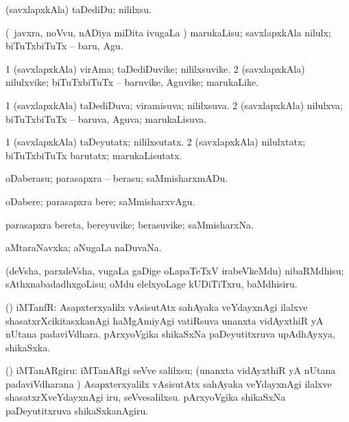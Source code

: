 \bentry
{}
\gl{\sakirx}
\bmng
(savxlapxkAla) taDediDu; nililxsu. 
\emng

\noindent 
\gl{\akirx}
\bmng
(\kanmu\ javxra, noVvu, nADiya miDita ivugaLa \vi) marukaLisu; savxlapxkAla nilulx; biTuTxbiTuTx -- baru, Agu. 
\emng
\eentry

\bentry
{}
\gl{\nA}
\bmng
\bnum
\num{1} (savxlapxkAla) virAma; taDediDuvike; nililxsuvike. 
\num{2} (savxlapxkAla) nilulxvike; biTuTxbiTuTx -- baruvike, Aguvike; marukaLike. 
\enum
\emng
\eentry

\bentry
{}
\gl{\gu}
\bmng
\bnum
\num{1} (savxlapxkAla) taDediDuva; viramisuva; nililxsuva. 
\num{2} (savxlapxkAla) nilulxva; biTuTxbiTuTx -- baruva, Aguva; marukaLisuva. 
\enum
\emng
\eentry

\bentry
{}
\gl{\kirxvi}
\bmng
\bnum
\num{1} (savxlapxkAla) taDeyutatx; nililxsutatx. 
\num{2} (savxlapxkAla) nilulxtatx; biTuTxbiTuTx barutatx; marukaLisutatx. 
\enum
\emng
\eentry

\bentry
{}
\gl{\sakirx}
\bmng
oDaberasu; parasapxra -- berasu; saMmisharxmADu. 
\emng

\noindent 
\gl{\akirx}
\bmng
oDabere; parasapxra bere; saMmisharxvAgu. 
\emng
\eentry

\bentry
{}
\gl{\nA}
\bmng
parasapxra bereta, bereyuvike; berasuvike; saMmisharxNa. 
\emng
\eentry

\bentry
{}
\gl{\gu}
\bmng
aMtaraNavxka; aNugaLa naDuvaNa. 
\emng
\eentry

\bentry
{}
\gl{\sakirx}
\bmng
(deVsha, parxdeVsha, \mo vugaLa gaDige oLapaTeTxV irabeVkeMdu) nibaRMdhisu; sAthxnabadadhxgoLisu; oMdu elelxyoLage kUDiTiTxru, baMdhisiru. 
\emng
\eentry

\bentry
{}
\gl{\nA}
\bmng
 (\ame) iMTanfR: 
\banum
{} Asapxterxyalilx vAsisutAtx sahAyaka veYdayxnAgi ilalxve shasatxrXcikitasxkanAgi haMgAmiyAgi vatiRsuva unanxta vidAyxthiR yA nUtana padaviVdhara. 
 pArxyoVgika shikaSxNa paDeyutitxruva upAdhAyxya, shikaSxka. 
\eanum
\emng
\eentry

\bentry
{}
\gl{\akirx}
\bmng
(\ame) iMTanARgiru: 
\banum
{} iMTanARgi seVve salilxsu; (unanxta vidAyxthiR yA nUtana padaviVdharana \vi) Asapxterxyalilx vAsisutAtx sahAyaka veYdayxnAgi ilalxve shasatxrXveYdayxnAgi iru, seVvesalilxsu. 
 pArxyoVgika shikaSxNa paDeyutitxruva shikaSxkanAgiru. 
\eanum
\emng
\eentry

